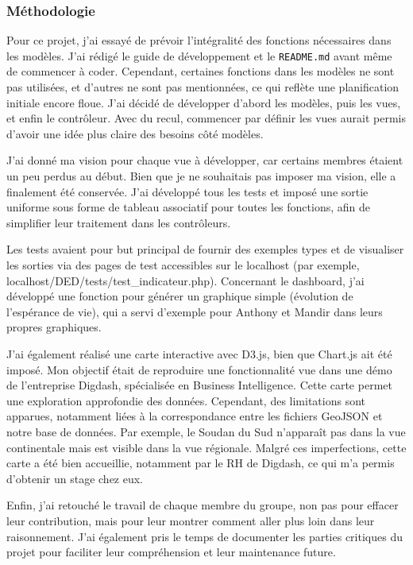 \documentclass[11pt]{article}
\begin{document}
\subsubsection*{Méthodologie}
Pour ce projet, j’ai essayé de prévoir l’intégralité des fonctions nécessaires dans les modèles. J’ai rédigé le guide de développement et le \texttt{README.md} avant même de commencer à coder. Cependant, certaines fonctions dans les modèles ne sont pas utilisées, et d’autres ne sont pas mentionnées, ce qui reflète une planification initiale encore floue. J’ai décidé de développer d’abord les modèles, puis les vues, et enfin le contrôleur. Avec du recul, commencer par définir les vues aurait permis d’avoir une idée plus claire des besoins côté modèles.

J’ai donné ma vision pour chaque vue à développer, car certains membres étaient un peu perdus au début. Bien que je ne souhaitais pas imposer ma vision, elle a finalement été conservée. J’ai développé tous les tests et imposé une sortie uniforme sous forme de tableau associatif pour toutes les fonctions, afin de simplifier leur traitement dans les contrôleurs.

Les tests avaient pour but principal de fournir des exemples types et de visualiser les sorties via des pages de test accessibles sur le localhost (par exemple, localhost/DED/tests/test\_indicateur.php). Concernant le dashboard, j’ai développé une fonction pour générer un graphique simple (évolution de l’espérance de vie), qui a servi d’exemple pour Anthony et Mandir dans leurs propres graphiques.

J’ai également réalisé une carte interactive avec D3.js, bien que Chart.js ait été imposé. Mon objectif était de reproduire une fonctionnalité vue dans une démo de l’entreprise Digdash, spécialisée en Business Intelligence. Cette carte permet une exploration approfondie des données. Cependant, des limitations sont apparues, notamment liées à la correspondance entre les fichiers GeoJSON et notre base de données. Par exemple, le Soudan du Sud n’apparaît pas dans la vue continentale mais est visible dans la vue régionale. Malgré ces imperfections, cette carte a été bien accueillie, notamment par le RH de Digdash, ce qui m’a permis d’obtenir un stage chez eux.

Enfin, j’ai retouché le travail de chaque membre du groupe, non pas pour effacer leur contribution, mais pour leur montrer comment aller plus loin dans leur raisonnement. J’ai également pris le temps de documenter les parties critiques du projet pour faciliter leur compréhension et leur maintenance future.
\end{document}

